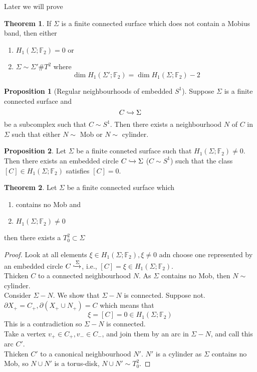 \documentclass[a4paper,14pt]{extarticle}
\theoremstyle{definition}
\newtheorem*{theorem}{Theorem}
\newtheorem*{proposition}{Proposition}
\begin{document}
Later we will prove
\begin{theorem}
	If $\Sigma$ is a finite connected surface which does not contain a Mobius band, then either
	\begin{enumerate}
		\item $H_1(\Sigma;\mathbb{F}_2)=0$ or 
		\item $\Sigma\sim\Sigma'\# T^2$ where \[\dim H_1(\Sigma';\mathbb{F}_2)=\dim H_1(
			\Sigma;\mathbb{F}_2)-2\]
	\end{enumerate}        
\end{theorem}

\begin{proposition}[Regular neighbourhoods of embedded $S^1$]
	Suppose $\Sigma$ is a finite connected surface and \[C\xhookrightarrow{}\Sigma\] be a 
	subcomplex such that $C\sim S^1$. Then there exists a neighbourhood $N$ of $C$ in $\Sigma$
	such that either $N\sim$ Mob or $N\sim$ cylinder.
\end{proposition}

\begin{proposition}
	Let $\Sigma$ be a finite conneted surface such that $H_1(\Sigma;\mathbb{F}_2)\neq0$. Then
	there exists an embedded circle $C\xhookrightarrow{}\Sigma$ ($C\sim S^1$) such that 
	the class $[C]\in H_1(\Sigma;\mathbb{F}_2)$ satisfies $[C]=0$.
\end{proposition}

\begin{theorem}
	Let $\Sigma$ be a finite connected surface which 
	\begin{enumerate}
		\item contains no Mob and 
		\item $H_1(\Sigma;\mathbb{F}_2)\neq0$ 
	\end{enumerate}
	then there exists a $T_0^2\subset\Sigma$
\end{theorem}

\begin{proof}
	Look at all elements $\xi\in H_1(\Sigma;\mathbb{F}_2), \xi\neq0$ adn choose one represented 
	by an embedded circle $C\xhookrightarrow{\Sigma}$, i.e., $[C]=\xi\in H_1(\Sigma;\mathbb{F}_2)$. \\

	Thicken $C$ to a connected neighbourhood $N$. As $\Sigma$ contains no Mob, then $N\sim$ 
	cylinder. \\

	Consider $\Sigma-N$. We show that $\Sigma-N$ is connected. Suppose not. $\partial X_+=
	C_+, \partial(X_+\cup N_+)=C$ which means that \[\xi=[C]=0\in H_1(\Sigma;\mathbb{F}_2)\]
	This is a contradiction so $\Sigma-N$ is connected. \\

	Take a vertex $v_+\in C_+, v_-\in C_-$, and join them by an arc in $\Sigma-N$, and call
	this arc $C'$. \\

	Thicken $C'$ to a canonical neighbourhood $N'$. $N'$ is a cylinder as $\Sigma$ contains
	no Mob, so $N\cup N'$ is a torus-disk, $N\cup N'\sim T_0^2$.
\end{proof}
\end{document}
